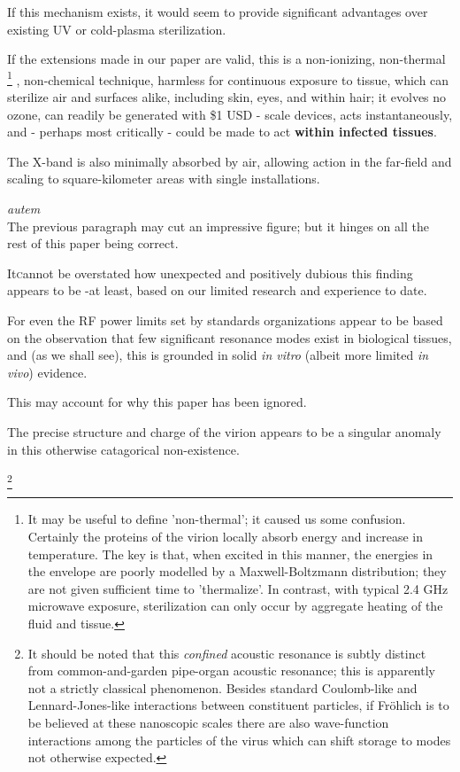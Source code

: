 \documentclass[fleqn,10pt]{article}
\begin{document}
\begin{multicols}{1}
If this mechanism exists, it would seem to provide significant advantages over existing UV or cold-plasma sterilization. 

If the extensions made in our paper are valid, this is a non-ionizing, non-thermal
%
\footnote{It may be useful to define 'non-thermal'; it caused us some confusion. Certainly the proteins of the virion locally absorb energy and increase in temperature. The key is that, when excited in this manner, the energies in the envelope are poorly modelled by a Maxwell-Boltzmann distribution; they are not given sufficient time to 'thermalize'. In contrast, with typical 2.4 GHz microwave exposure, sterilization can only occur by aggregate heating of the fluid and tissue.} 
%
, non-chemical technique, harmless for continuous exposure to tissue, which can sterilize air and surfaces alike, including skin, eyes, and within hair; it evolves no ozone, can readily be generated with \$1 USD - scale devices, acts instantaneously, and - perhaps most critically - could be made to act {\bf within infected tissues}.

The X-band is also minimally absorbed by air, allowing action in the far-field and scaling to square-kilometer areas with single installations.

\begin{autem}

{\it autem}\\
The previous paragraph may cut an impressive figure; but it hinges on all the rest of this paper being correct.

\end{autem}

\lettrine{It} cannot be overstated how unexpected and positively dubious this finding appears to be -at least, based on our limited research and experience to date.

For even the RF power limits set by standards organizations appear to be based on the observation that few significant resonance modes exist in biological tissues, and (as we shall see), this is grounded in solid {\it in vitro} (albeit more limited {\it in vivo}) evidence. 

This may account for why this paper has been ignored.

The precise structure and charge of the virion appears to be a singular anomaly in this otherwise catagorical non-existence.


\footnote{It should be noted that this {\it confined} acoustic resonance is subtly distinct from common-and-garden pipe-organ acoustic resonance; this is apparently not a strictly classical phenomenon. Besides standard Coulomb-like and Lennard-Jones-like interactions between constituent particles, if Fr\"{o}hlich is to be believed at these nanoscopic scales there are also wave-function interactions among the particles of the virus which can shift storage to modes not otherwise expected.

}
\end{multicols}
\end{document}

